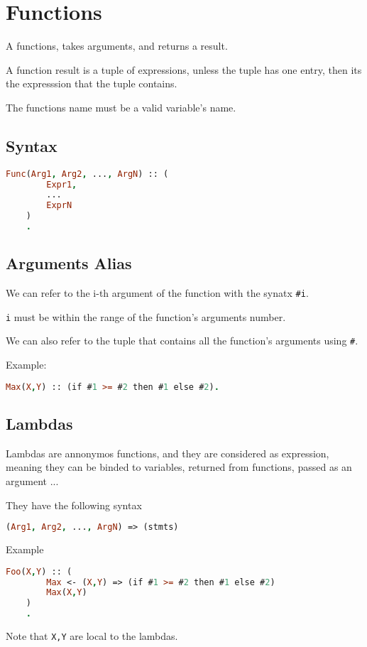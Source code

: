 \section{Functions}


A functions, takes arguments, and returns a result. 

A function result is a tuple of expressions, unless
the tuple has one entry, then its the expresssion 
that the tuple contains.

The functions name must be a valid variable's name.

\subsection{Syntax}


\begin{lstlisting}[language = Prolog]
    Func(Arg1, Arg2, ..., ArgN) :: (
        Expr1,
        ...
        ExprN
    )
    .
\end{lstlisting}

\subsection{Arguments Alias}

We can refer to the i-th argument of the function with
the synatx \texttt{#i}.

\texttt{i} must be within the range of the function's arguments number.

We can also refer to the tuple that contains all the function's 
arguments using \texttt{#}.

Example:

\begin{lstlisting}[language = Prolog]
    Max(X,Y) :: (if #1 >= #2 then #1 else #2).
\end{lstlisting}



\subsection{Lambdas}

Lambdas are annonymos functions, and they are considered as 
expression, meaning they can be binded to variables, returned 
from functions, passed as an argument ...

They have the following syntax


\begin{lstlisting}[language = Prolog]
    (Arg1, Arg2, ..., ArgN) => (stmts)
\end{lstlisting}

Example

\begin{lstlisting}[language = Prolog]
    Foo(X,Y) :: (
        Max <- (X,Y) => (if #1 >= #2 then #1 else #2)
        Max(X,Y)
    )
    .
\end{lstlisting}

Note that \texttt{X,Y} are local to the lambdas.
